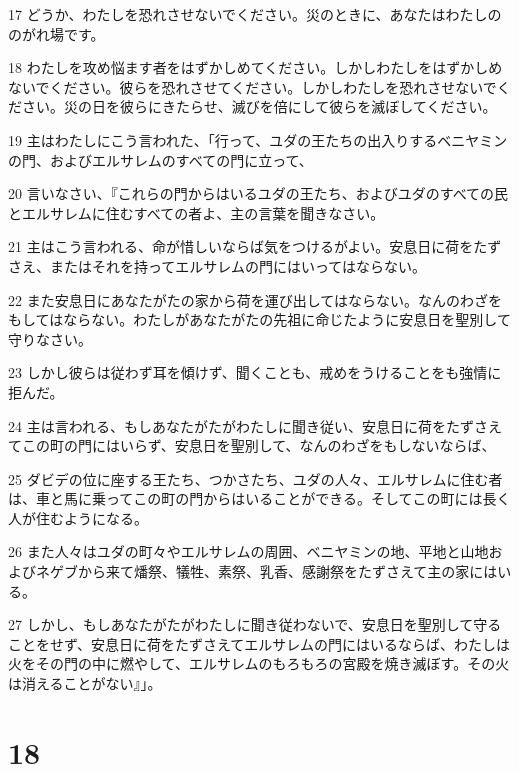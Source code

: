 \par 17 どうか、わたしを恐れさせないでください。災のときに、あなたはわたしののがれ場です。
\par 18 わたしを攻め悩ます者をはずかしめてください。しかしわたしをはずかしめないでください。彼らを恐れさせてください。しかしわたしを恐れさせないでください。災の日を彼らにきたらせ、滅びを倍にして彼らを滅ぼしてください。
\par 19 主はわたしにこう言われた、「行って、ユダの王たちの出入りするベニヤミンの門、およびエルサレムのすべての門に立って、
\par 20 言いなさい、『これらの門からはいるユダの王たち、およびユダのすべての民とエルサレムに住むすべての者よ、主の言葉を聞きなさい。
\par 21 主はこう言われる、命が惜しいならば気をつけるがよい。安息日に荷をたずさえ、またはそれを持ってエルサレムの門にはいってはならない。
\par 22 また安息日にあなたがたの家から荷を運び出してはならない。なんのわざをもしてはならない。わたしがあなたがたの先祖に命じたように安息日を聖別して守りなさい。
\par 23 しかし彼らは従わず耳を傾けず、聞くことも、戒めをうけることをも強情に拒んだ。
\par 24 主は言われる、もしあなたがたがわたしに聞き従い、安息日に荷をたずさえてこの町の門にはいらず、安息日を聖別して、なんのわざをもしないならば、
\par 25 ダビデの位に座する王たち、つかさたち、ユダの人々、エルサレムに住む者は、車と馬に乗ってこの町の門からはいることができる。そしてこの町には長く人が住むようになる。
\par 26 また人々はユダの町々やエルサレムの周囲、ベニヤミンの地、平地と山地およびネゲブから来て燔祭、犠牲、素祭、乳香、感謝祭をたずさえて主の家にはいる。
\par 27 しかし、もしあなたがたがわたしに聞き従わないで、安息日を聖別して守ることをせず、安息日に荷をたずさえてエルサレムの門にはいるならば、わたしは火をその門の中に燃やして、エルサレムのもろもろの宮殿を焼き滅ぼす。その火は消えることがない』」。

\chapter{18}

